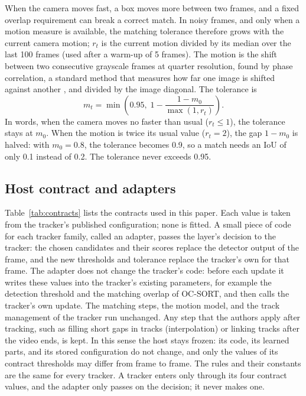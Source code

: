When the camera moves fast, a box moves more between two frames, and a fixed
overlap requirement can break a correct match. In noisy frames, and only when
a motion measure is available, the matching tolerance therefore grows with
the current camera motion; $r_t$ is the current motion divided by its median
over the last 100 frames (used after a warm-up of 5 frames). The motion is the shift between two consecutive grayscale
frames at quarter resolution, found by phase correlation, a standard method
that measures how far one image is shifted against another
\cite{reddy1996phasecorr}, and divided by the image diagonal. The tolerance is
\begin{equation}
m_t=\min\!\left(0.95,\;1-\frac{1-m_0}{\max(1,r_t)}\right).
\label{eq:motion}
\end{equation}
In words, when the camera moves no faster than usual ($r_t\le1$), the
tolerance stays at $m_0$. When the motion is twice its usual value
($r_t=2$), the gap $1-m_0$ is halved: with $m_0=0.8$, the tolerance becomes
0.9, so a match needs an IoU of only 0.1 instead of 0.2. The tolerance never
exceeds 0.95.

\subsection{Host contract and adapters}\label{sec:contract}
Table~\ref{tab:contracts} lists the contracts used in this paper. Each value
is taken from the tracker's published configuration; none is fitted. A small
piece of code for each tracker family, called an adapter, passes the layer's
decision to the tracker:
the chosen candidates and their scores replace the detector output of the
frame, and the new thresholds and tolerance replace the tracker's own for
that frame. The adapter does not change the tracker's code: before each
update it writes these values into the tracker's existing parameters, for
example the detection threshold and the matching overlap of OC-SORT, and then
calls the tracker's own update. The matching steps, the motion model, and the
track management of the tracker run unchanged. Any step that the authors apply after tracking, such as
filling short gaps in tracks (interpolation) or linking tracks after the video
ends, is kept. In this sense the host stays frozen: its code, its learned
parts, and its stored configuration do not change, and only the values of its
contract thresholds may differ from frame to frame. The rules and their constants are
the same for every tracker. A tracker enters only through its four contract
values, and the adapter only passes on the decision; it never makes one.

